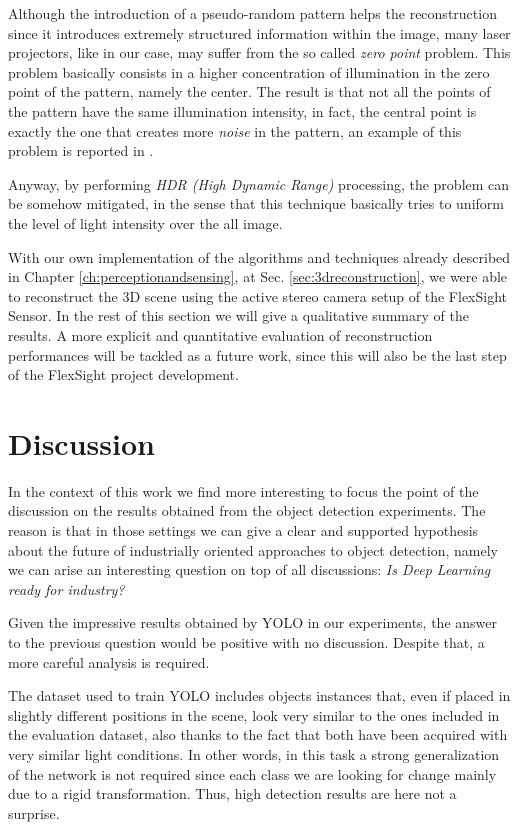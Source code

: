 Although the introduction of a pseudo-random pattern helps the reconstruction since it introduces extremely structured information within the image, many laser projectors, like in our case, may suffer from the so called \emph{zero point} problem. This problem basically consists in a higher concentration of illumination in the zero point of the pattern, namely the center. The result is that not all the points of the pattern have the same illumination intensity, in fact, the central point is exactly the one that creates more \emph{noise} in the pattern, an example of this problem is reported in .

Anyway, by performing \emph{HDR (High Dynamic Range)} processing, the problem can be somehow mitigated, in the sense that this technique basically tries to uniform the level of light intensity over the all image.

With our own implementation of the algorithms and techniques already described in Chapter \ref{ch:perceptionandsensing}, at Sec. \ref{sec:3dreconstruction}, we were able to reconstruct the 3D scene using the active stereo camera setup of the FlexSight Sensor. In the rest of this section we will give a qualitative summary of the results. A more explicit and quantitative evaluation of reconstruction performances will be tackled as a future work, since this will also be the last step of the FlexSight project development.

\section{Discussion}\label{sec:exp_discussion}
In the context of this work we find more interesting to focus the point of the discussion on the results obtained from the object detection experiments. The reason is that in those settings we can give a clear and supported hypothesis about the future of industrially oriented approaches to object detection, namely we can arise an interesting question on top of all discussions: \emph{Is Deep Learning ready for industry?}

Given the impressive results obtained by YOLO in our experiments, the answer to the previous question would be positive with no discussion. Despite that, a more careful analysis is required.

The dataset used to train YOLO includes objects instances that, even if placed in slightly different positions in the scene, look very similar to the ones included in the evaluation dataset, also thanks to the fact that both have been acquired with very similar light conditions. In other words, in this task a strong generalization of the network is not required since each class we are looking for change mainly due to a rigid transformation. Thus, high detection results are here not a surprise. 

